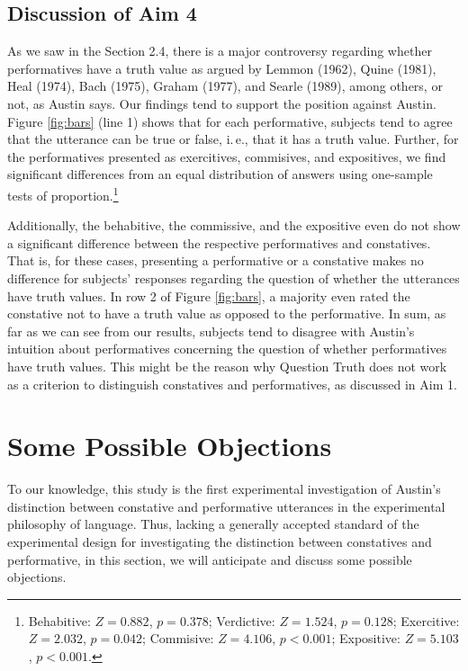 \documentclass[egregdoesnotlikesansseriftitles,12pt]{scrartcl}
\begin{document}
\subsection{Discussion of Aim 4}
As we saw in the Section 2.4, there is a major controversy regarding whether performatives have a truth value as argued by Lemmon (1962), Quine (1981), Heal (1974), Bach (1975), Graham (1977), and Searle (1989), among others, or not, as Austin says. Our findings tend to support the position against Austin. Figure \ref{fig:bars} (line 1) shows that for each performative, subjects tend to agree that the utterance can be true or false, i.\,e., that it has a truth value. Further, for the performatives presented as exercitives, commisives, and expositives, we find significant differences from an equal distribution of answers using one-sample tests of proportion.\footnote{Behabitive: $Z=0.882$, $p=0.378$; Verdictive: $Z=1.524$, $p=0.128$; Exercitive: $Z=2.032$, $p=0.042$; Commisive: $Z=4.106$, $p<0.001$; Expositive: $Z=5.103$, $p<0.001$.}

Additionally, the behabitive, the commissive, and the expositive even do not show a significant difference between the respective performatives and constatives. That is, for these cases, presenting a performative or a constative makes no difference for subjects' responses regarding the question of whether the utterances have truth values. In row 2 of Figure \ref{fig:bars}, a majority even rated the constative not to have a truth value as opposed to the performative. In sum, as far as we can see from our results, subjects tend to disagree with Austin's intuition about performatives concerning the question of whether performatives have truth values. This might be the reason why Question Truth does not work as a criterion to distinguish constatives and performatives, as discussed in Aim 1.

\section{Some Possible Objections}\label{sec:objections}
To our knowledge, this study is the first experimental investigation of Austin's distinction between constative and performative utterances in the experimental philosophy of language. Thus, lacking a generally accepted standard of the experimental design for investigating the distinction between constatives and performative, in this section, we will anticipate and discuss some possible objections. \\
\end{document}
